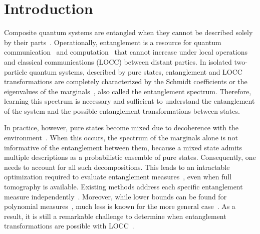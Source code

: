 \documentclass[aps,pra,onecolumn,superscriptaddress]{revtex4-2}
\begin{document}
\section{Introduction}
Composite quantum systems are entangled when they cannot be described solely by their parts~\cite{epr}. Operationally, entanglement is a resource for quantum communication~\cite{distributed, eckert} and computation~\cite{one-way, shor} that cannot increase under local operations and classical communications (LOCC) between distant parties.
In isolated two-particle quantum systems, described by pure states, entanglement and LOCC transformations are completely characterized by
the Schmidt coefficients or the eigenvalues of the marginals~\cite{Nielsen1999MajLOCC, Vidal_2000}, also called
the entanglement spectrum. Therefore, learning this spectrum is
necessary and sufficient to understand the entanglement of the
system and the possible entanglement transformations between
states.

In practice, however, pure states become mixed due to decoherence with the environment~\cite{Zurek2003,BreuerPetruccione2002,NielsenChuang2010}. When this occurs, the spectrum of the marginals alone is not informative of the entanglement between them, because a mixed state admits multiple descriptions as a probabilistic ensemble of pure states. Consequently,
one needs to account for all such decompositions. This leads to an intractable optimization required to evaluate entanglement measures~\cite{Bennett1996EoF, Uhlmann1998, Uhlmann2010Roofs, Horodecki2009RMP}, even when full tomography is available.
Existing methods address each specific entanglement measure independently~\cite{Wootters1998, TerhalVollbrecht2000, VollbrechtWerner2001, Mintert2004Concurrence, Chen2005Concurrence, Chen2005EoF, Guhne2007Estimating, Eisert2007QuantWitness}. Moreover, while lower bounds can be found for polynomial measures~\cite{Toth2015CroofTP}, much less is known for the more general case~\cite{PlenioVirmani2007}. As a result, it is still a remarkable challenge to determine when entanglement transformations are possible with LOCC~\cite{Gour2005InfiniteConditions, Chitambar2014LOCC, Sauerwein_2018}.
\end{document}
